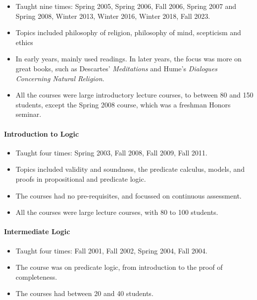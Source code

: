 \documentclass[
  10pt,
  letterpaper,
  DIV=11,
  numbers=noendperiod,
  twoside]{scrartcl}
\let\oldparagraph\paragraph
\renewcommand{\paragraph}[1]{\oldparagraph{#1}\mbox{}}
\providecommand{\tightlist}{%
  \setlength{\itemsep}{0pt}\setlength{\parskip}{0pt}}\usepackage{longtable,booktabs,array}
\begin{document}
\begin{itemize}
\tightlist
\item
  Taught nine times: Spring 2005, Spring 2006, Fall 2006, Spring 2007
  and Spring 2008, Winter 2013, Winter 2016, Winter 2018, Fall 2023.
\item
  Topics included philosophy of religion, philosophy of mind, scepticism
  and ethics
\item
  In early years, mainly used readings. In later years, the focus was
  more on great books, such as Descartes' \emph{Meditations} and Hume's
  \emph{Dialogues Concerning Natural Religion}.
\item
  All the courses were large introductory lecture courses, to between 80
  and 150 students, except the Spring 2008 course, which was a freshman
  Honors seminar.
\end{itemize}

\paragraph{Introduction to Logic}\label{introduction-to-logic}

\begin{itemize}
\tightlist
\item
  Taught four times: Spring 2003, Fall 2008, Fall 2009, Fall 2011.
\item
  Topics included validity and soundness, the predicate calculus,
  models, and proofs in propositional and predicate logic.
\item
  The courses had no pre-requisites, and focussed on continuous
  assessment.
\item
  All the courses were large lecture courses, with 80 to 100 students.
\end{itemize}

\paragraph{Intermediate Logic}\label{intermediate-logic}

\begin{itemize}
\tightlist
\item
  Taught four times: Fall 2001, Fall 2002, Spring 2004, Fall 2004.
\item
  The course was on predicate logic, from introduction to the proof of
  completeness.
\item
  The courses had between 20 and 40 students.
\end{itemize}
\end{document}
